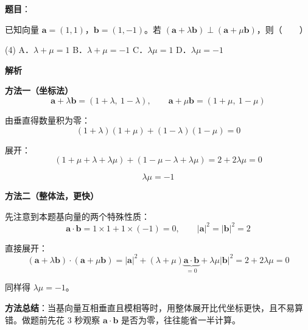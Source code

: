 \begin{answer}

\textbf{题目}：

已知向量 $\boldsymbol a=(1,1)$，$\boldsymbol b=(1,-1)$。若 $(\boldsymbol a+\lambda\boldsymbol b)\perp(\boldsymbol a+\mu\boldsymbol b)$，则\mbox{（　　）}

\begin{gkopts}(4)
\task A．$\lambda+\mu=1$
\task B．$\lambda+\mu=-1$
\task C．$\lambda\mu=1$
\task D．$\lambda\mu=-1$
\end{gkopts}

\textbf{解析}

\textbf{方法一（坐标法）}
\nopagebreak[4]
\[\boldsymbol a+\lambda\boldsymbol b=(1+\lambda,\ 1-\lambda),\qquad \boldsymbol a+\mu\boldsymbol b=(1+\mu,\ 1-\mu)\]

由垂直得数量积为零：
\nopagebreak[4]
\[(1+\lambda)(1+\mu)+(1-\lambda)(1-\mu)=0\]

展开：
\nopagebreak[4]
\[\left(1+\mu+\lambda+\lambda\mu\right)+\left(1-\mu-\lambda+\lambda\mu\right)=2+2\lambda\mu=0\]

\nopagebreak[4]
\[\lambda\mu=-1\]

\textbf{方法二（整体法，更快）}

先注意到本题基向量的两个特殊性质：
\nopagebreak[4]
\[\boldsymbol a\cdot\boldsymbol b=1\times1+1\times(-1)=0,\qquad |\boldsymbol a|^{2}=|\boldsymbol b|^{2}=2\]

直接展开：
\nopagebreak[4]
\[(\boldsymbol a+\lambda\boldsymbol b)\cdot(\boldsymbol a+\mu\boldsymbol b)=|\boldsymbol a|^{2}+(\lambda+\mu)\underbrace{\boldsymbol a\cdot\boldsymbol b}_{=0}+\lambda\mu|\boldsymbol b|^{2}=2+2\lambda\mu=0\]

同样得 $\lambda\mu=-1$。

\begin{gktip}
\textbf{方法总结}：当基向量互相垂直且模相等时，用整体展开比代坐标更快，且不易算错。做题前先花 3 秒观察 $\boldsymbol a\cdot\boldsymbol b$ 是否为零，往往能省一半计算。
\end{gktip}


\par\medskip

\end{answer}
